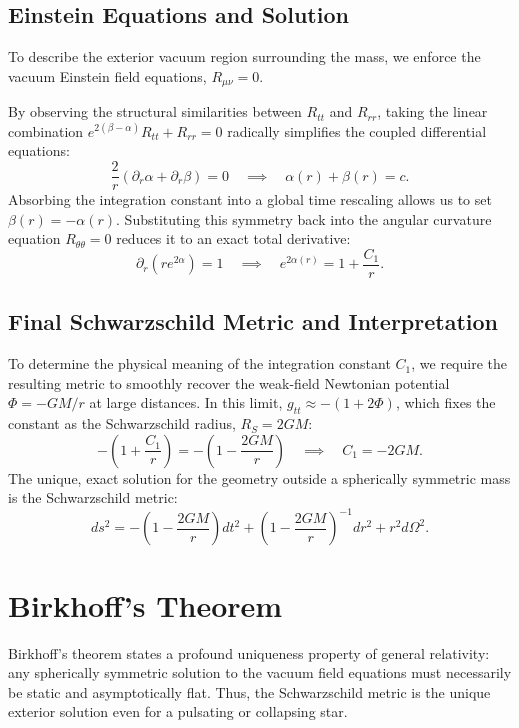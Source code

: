 \documentclass[11pt, a4paper]{report}
\begin{document}
\subsection{Einstein Equations and Solution}
To describe the exterior vacuum region surrounding the mass, we enforce the vacuum Einstein field equations, $R_{\mu\nu} = 0$. 

By observing the structural similarities between $R_{tt}$ and $R_{rr}$, taking the linear combination $e^{2(\beta-\alpha)} R_{tt} + R_{rr} = 0$ radically simplifies the coupled differential equations:
\begin{equation}
\frac{2}{r} \left( \partial_r\alpha + \partial_r\beta \right) = 0 \quad \implies \quad \alpha(r) + \beta(r) = c.
\end{equation}
Absorbing the integration constant into a global time rescaling allows us to set $\beta(r) = -\alpha(r)$. Substituting this symmetry back into the angular curvature equation $R_{\theta\theta} = 0$ reduces it to an exact total derivative:
\begin{equation}
\partial_r \left( r e^{2\alpha} \right) = 1 \quad \implies \quad e^{2\alpha(r)} = 1 + \frac{C_1}{r}.
\end{equation}

\subsection{Final Schwarzschild Metric and Interpretation}
To determine the physical meaning of the integration constant $C_1$, we require the resulting metric to smoothly recover the weak-field Newtonian potential $\Phi = -GM/r$ at large distances. In this limit, $g_{tt} \approx -(1 + 2\Phi)$, which fixes the constant as the Schwarzschild radius, $R_S = 2GM$:
\begin{equation}
-\left( 1 + \frac{C_1}{r} \right) = -\left( 1 - \frac{2GM}{r} \right) \quad \implies \quad C_1 = -2GM.
\end{equation}
The unique, exact solution for the geometry outside a spherically symmetric mass is the Schwarzschild metric:
\begin{equation}
ds^2 = -\left( 1 - \frac{2GM}{r} \right) dt^2 + \left( 1 - \frac{2GM}{r} \right)^{-1} dr^2 + r^2 d\Omega^2.
\end{equation}

\section{Birkhoff's Theorem}
Birkhoff's theorem states a profound uniqueness property of general relativity: any spherically symmetric solution to the vacuum field equations must necessarily be static and asymptotically flat. Thus, the Schwarzschild metric is the unique exterior solution even for a pulsating or collapsing star.
\end{document}
